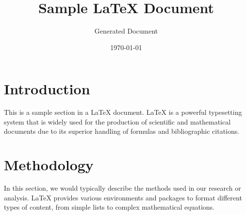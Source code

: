 \documentclass{article}
\title{Sample LaTeX Document}
\author{Generated Document}
\date{\today}
\begin{document}
\maketitle

\section{Introduction}
This is a sample section in a LaTeX document. LaTeX is a powerful typesetting system that is widely used for the production of scientific and mathematical documents due to its superior handling of formulas and bibliographic citations.

\section{Methodology}
In this section, we would typically describe the methods used in our research or analysis. LaTeX provides various environments and packages to format different types of content, from simple lists to complex mathematical equations.
\end{document}
